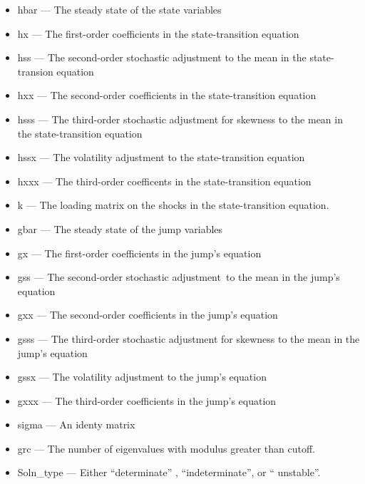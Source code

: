 \documentclass[notitlepage,11pt]{article}
\begin{document}
\begin{itemize}
\item hbar --- The steady state of the state variables

\item hx --- The first-order coefficients in the state-transition equation

\item hss --- The second-order stochastic adjustment to the mean in the
state-transion equation

\item hxx --- The second-order coefficients in the state-transition equation

\item hsss --- The third-order stochastic adjustment for skewness to the
mean in the state-transition equation

\item hssx --- The volatility adjustment to the state-transition equation

\item hxxx --- The third-order coefficents in the state-transition equation

\item k --- The loading matrix on the shocks in the state-transition
equation.

\item gbar --- The steady state of the jump variables

\item gx --- The first-order coefficients in the jump's equation

\item gss --- The second-order stochastic adjustment\ to the mean in the
jump's equation

\item gxx --- The second-order coefficients in the jump's equation

\item gsss --- The third-order stochastic adjustment for skewness to the
mean in the jump's equation

\item gssx --- The volatility adjustment to the jump's equation

\item gxxx --- The third-order coefficients in the jump's equation

\item sigma --- An identy matrix

\item grc --- The number of eigenvalues with modulus greater than cutoff.

\item Soln\_type --- Either \textquotedblleft determinate\textquotedblright
, \textquotedblleft indeterminate\textquotedblright , or \textquotedblleft
unstable\textquotedblright .
\end{itemize}
\end{document}

